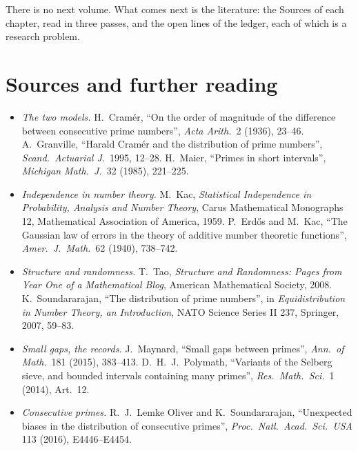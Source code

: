 There is no next volume. What comes next is the literature: the Sources of each chapter, read in three passes, and the open lines of the ledger, each of which is a research problem.

\section*{Sources and further reading}

\begin{itemize}
\item \emph{The two models.} H.~Cram\'er, ``On the order of magnitude of the difference between consecutive prime numbers'', \emph{Acta Arith.}\ 2 (1936), 23--46. A.~Granville, ``Harald Cram\'er and the distribution of prime numbers'', \emph{Scand.\ Actuarial J.}\ 1995, 12--28. H.~Maier, ``Primes in short intervals'', \emph{Michigan Math.\ J.}\ 32 (1985), 221--225.
\item \emph{Independence in number theory.} M.~Kac, \emph{Statistical Independence in Probability, Analysis and Number Theory}, Carus Mathematical Monographs 12, Mathematical Association of America, 1959. P.~Erd\H{o}s and M.~Kac, ``The Gaussian law of errors in the theory of additive number theoretic functions'', \emph{Amer.\ J.\ Math.}\ 62 (1940), 738--742.
\item \emph{Structure and randomness.} T.~Tao, \emph{Structure and Randomness: Pages from Year One of a Mathematical Blog}, American Mathematical Society, 2008. K.~Soundararajan, ``The distribution of prime numbers'', in \emph{Equidistribution in Number Theory, an Introduction}, NATO Science Series II 237, Springer, 2007, 59--83.
\item \emph{Small gaps, the records.} J.~Maynard, ``Small gaps between primes'', \emph{Ann.\ of Math.}\ 181 (2015), 383--413. D.~H.~J.~Polymath, ``Variants of the Selberg sieve, and bounded intervals containing many primes'', \emph{Res.\ Math.\ Sci.}\ 1 (2014), Art.~12.
\item \emph{Consecutive primes.} R.~J.~Lemke Oliver and K.~Soundararajan, ``Unexpected biases in the distribution of consecutive primes'', \emph{Proc.\ Natl.\ Acad.\ Sci.\ USA} 113 (2016), E4446--E4454.
\end{itemize}

